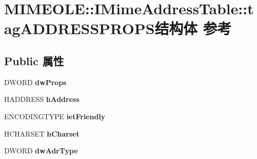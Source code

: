 \hypertarget{struct_m_i_m_e_o_l_e_1_1_i_mime_address_table_1_1tag_a_d_d_r_e_s_s_p_r_o_p_s}{}\section{M\+I\+M\+E\+O\+LE\+:\+:I\+Mime\+Address\+Table\+:\+:tag\+A\+D\+D\+R\+E\+S\+S\+P\+R\+O\+P\+S结构体 参考}
\label{struct_m_i_m_e_o_l_e_1_1_i_mime_address_table_1_1tag_a_d_d_r_e_s_s_p_r_o_p_s}
\subsection*{Public 属性}
\begin{DoxyCompactItemize}
\item 
\mbox{\label{struct_m_i_m_e_o_l_e_1_1_i_mime_address_table_1_1tag_a_d_d_r_e_s_s_p_r_o_p_s_af7ab9f5bc5b5feda64106c731f676aba}} 
D\+W\+O\+RD {\bfseries dw\+Props}
\item 
\mbox{\label{struct_m_i_m_e_o_l_e_1_1_i_mime_address_table_1_1tag_a_d_d_r_e_s_s_p_r_o_p_s_ad7b24f85e9c4bab3dcfbbad16197adb4}} 
H\+A\+D\+D\+R\+E\+SS {\bfseries h\+Address}
\item 
\mbox{\label{struct_m_i_m_e_o_l_e_1_1_i_mime_address_table_1_1tag_a_d_d_r_e_s_s_p_r_o_p_s_a8b0e32ff3b4e002615fdda9b75e53d55}} 
E\+N\+C\+O\+D\+I\+N\+G\+T\+Y\+PE {\bfseries iet\+Friendly}
\item 
\mbox{\label{struct_m_i_m_e_o_l_e_1_1_i_mime_address_table_1_1tag_a_d_d_r_e_s_s_p_r_o_p_s_a2de98dde9639ceec9c78477445860d46}} 
H\+C\+H\+A\+R\+S\+ET {\bfseries h\+Charset}
\item 
\mbox{\label{struct_m_i_m_e_o_l_e_1_1_i_mime_address_table_1_1tag_a_d_d_r_e_s_s_p_r_o_p_s_a82b3d47b99d1baa7d5ef2539a6ac2aa4}} 
D\+W\+O\+RD {\bfseries dw\+Adr\+Type}

\end{DoxyCompactItemize}
